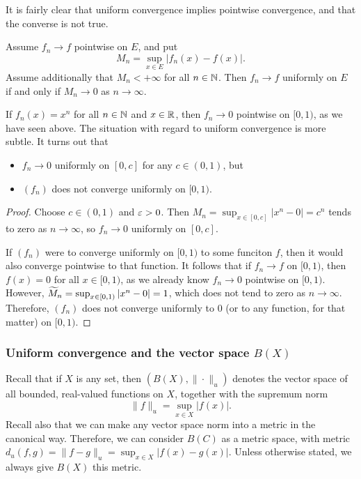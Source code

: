 \documentclass[12pt]{scrartcl} %
\begin{document}
It is fairly clear that uniform convergence implies pointwise convergence, and that the converse is not true.

\begin{proposition}
    Assume $f_n \to f$ pointwise on $E$, and put \[M_n = \sup_{x \in E}|f_n(x) - f(x)|.\] Assume additionally that $M_n < + \infty$ for all $n \in \mathbb{N}$. Then $f_n \to f$ uniformly on $E$ if and only if $M_n \to 0$ as $n \to \infty$.
\end{proposition}

\begin{example}
    If $f_n(x) = x^n$ for all $n \in \mathbb{N}$ and $x \in \mathbb{R}$, then $f_n \to 0$ pointwise on $[0,1)$, as we have seen above. The situation with regard to uniform convergence is more subtle. It turns out that \begin{itemize}
        \item $f_n \to 0$ uniformly on $[0,c]$ for any $c \in (0,1)$, but
        \item $(f_n)$ does not converge uniformly on $[0,1)$.
    \end{itemize}

    \begin{proof}
        Choose $c \in (0,1)$ and $\varepsilon > 0$. Then $M_n = \sup_{x \in [0,c]}|x^n - 0| = c^n$ tends to zero as $n \to \infty$, so $f_n \to 0$ uniformly on $[0,c]$.

        If $(f_n)$ were to converge uniformly on $[0,1)$ to some funciton $f$, then it would also converge pointwise to that function. It follows that if $f_n \to f$ on $[0,1)$, then $f(x) = 0$ for all $x \in [0,1)$, as we already know $f_n \to 0$ pointwise on $[0,1)$. However, $\widetilde{M}_n = \sup_{x \in [0,1)}|x^n - 0| = 1$, which does not tend to zero as $n \to \infty$. Therefore, $(f_n)$ does not converge uniformly to $0$ (or to any function, for that matter) on $[0,1)$.
    \end{proof}
\end{example}

\subsubsection{Uniform convergence and the vector space $B(X)$}

Recall that if $X$ is any set, then $(B(X), \|\cdot\|_u)$ denotes the vector space of all bounded, real-valued functions on $X$, together with the supremum norm \[\|f\|_u = \sup_{x \in X}|f(x)|.\] Recall also that we can make any vector space norm into a metric in the canonical way. Therefore, we can consider $B(C)$ as a metric space, with metric $d_u(f, g) = \|f-g\|_u = \sup_{x \in X}|f(x) - g(x)|$. Unless otherwise stated, we always give $B(X)$ this metric.
\end{document}
